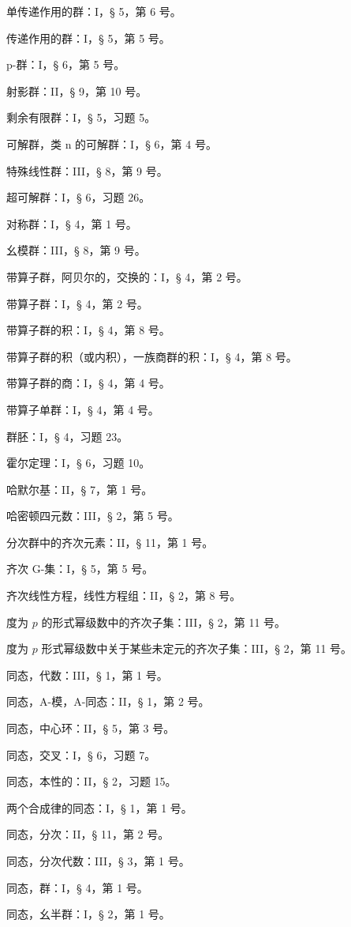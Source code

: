 单传递作用的群：I，§ 5，第 6 号。

传递作用的群：I，§ 5，第 5 号。

p-群：I，§ 6，第 5 号。

射影群：II，§ 9，第 10 号。

剩余有限群：I，§ 5，习题 5。

可解群，类 n 的可解群：I，§ 6，第 4 号。

特殊线性群：III，§ 8，第 9 号。

超可解群：I，§ 6，习题 26。

对称群：I，§ 4，第 1 号。

幺模群：III，§ 8，第 9 号。

带算子群，阿贝尔的，交换的：I，§ 4，第 2 号。

带算子群：I，§ 4，第 2 号。

带算子群的积：I，§ 4，第 8 号。

带算子群的积（或内积），一族商群的积：I，§ 4，第 8 号。

带算子群的商：I，§ 4，第 4 号。

带算子单群：I，§ 4，第 4 号。

群胚：I，§ 4，习题 23。

霍尔定理：I，§ 6，习题 10。

哈默尔基：II，§ 7，第 1 号。

哈密顿四元数：III，§ 2，第 5 号。

分次群中的齐次元素：II，§ 11，第 1 号。

齐次 G-集：I，§ 5，第 5 号。

齐次线性方程，线性方程组：II，§ 2，第 8 号。

度为 \(p\) 的形式幂级数中的齐次子集：III，§ 2，第 11 号。

度为 \(p\) 形式幂级数中关于某些未定元的齐次子集：III，§ 2，第 11 号。

同态，代数：III，§ 1，第 1 号。

同态，A-模，A-同态：II，§ 1，第 2 号。

同态，中心环：II，§ 5，第 3 号。

同态，交叉：I，§ 6，习题 7。

同态，本性的：II，§ 2，习题 15。

两个合成律的同态：I，§ 1，第 1 号。

同态，分次：II，§ 11，第 2 号。

同态，分次代数：III，§ 3，第 1 号。

同态，群：I，§ 4，第 1 号。

同态，幺半群：I，§ 2，第 1 号。

